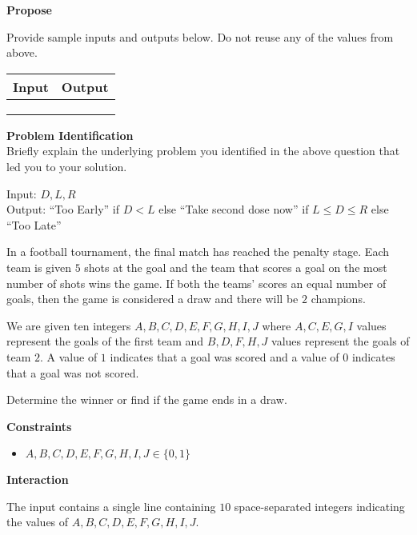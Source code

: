 \documentclass[a4paper]{exam}
\newcommand\heading[1]{\textbf{#1}}
\begin{document}
\begin{questions}
    \heading{Propose}

    Provide sample inputs and outputs below. Do not reuse any of the values from above.

    \begin{tabularx}{\textwidth}{|X|X|}
        \rowcolor{gray!50}
        \hline
        Input & Output \\ \hline\hline
              &        \\\hline
              &        \\\hline
              &        \\\hline
    \end{tabularx}


    \heading{Problem Identification}\\
    Briefly explain the underlying problem you identified in the above question that led you to your solution.

  \begin{mdframed}
    Input: $D,L,R$\\
    Output: ``Too Early'' if $D<L$ else ``Take second dose now'' if $L\leq D \leq R$ else  ``Too Late''
  \end{mdframed}


    In a football tournament, the final match has reached the penalty stage. Each team is given $5$ shots at the goal and the team that scores a goal on the most number of shots wins the game. If both the teams' scores an equal number of goals, then the game is considered a draw and there will be $2$ champions.

    We are given ten integers $A,B,C,D,E,F,G,H,I,J$ where $A,C,E,G,I$ values represent the goals of the first team and $B,D,F,H,J$ values represent the goals of team $2$. A value of $1$ indicates that a goal was scored and a value of $0$ indicates that a goal was not scored.

    Determine the winner or find if the game ends in a draw.

    \heading{Constraints}
    \begin{itemize}
        \item  $A,B,C,D,E,F,G,H,I,J \in \{0,1\}$
    \end{itemize}


    \heading{Interaction}

    The input contains a single line containing $10$ space-separated integers indicating the values of $A,B,C,D,E,F,G,H,I,J.$


\end{questions}
\end{document}
